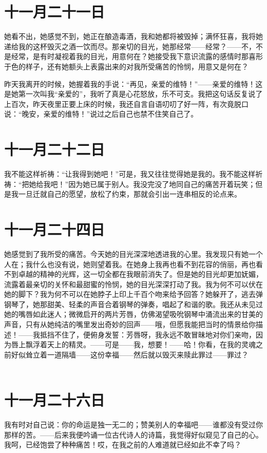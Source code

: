 \documentclass[12pt,oneside]{book}
\begin{document}
\chapter{十一月二十一日}
她看不出，她感觉不到，她正在酿造毒酒，我和她都将被毁掉；满怀狂喜，我将她递给我的这杯毁灭之酒一饮而尽。那亲切的目光，她那经常——经常？——不，不是经常，是有时凝视着我的目光，用意何在？她接受我下意识流露的感情时那喜形于色的样子，还有她额头上表露出来的对我所受痛苦的怜悯，用意又是何在？

昨天我离开的时候，她握着我的手说：“再见，亲爱的维特！”——亲爱的维特！这是她第一次叫我“亲爱的”，我听了真是心花怒放，乐不可支。我把这句话反复说了上百次，昨天夜里正要上床的时候，我还自言自语叨叨了好一阵，有次竟脱口说：“晚安，亲爱的维特！”说过之后自己也禁不住笑自己了。
　　

\chapter{十一月二十二日}
我不能这样祈祷：“让我得到她吧！”可是，我又往往觉得她是我的。我不能这样祈祷：“把她给我吧！”因为她已属于别人。我没完没了地同自己的痛苦开着玩笑；但是我一旦迁就自己的愿望，放松了约束，那就会引出一连串相反的论点来。
　　

\chapter{十一月二十四日}
她感觉到了我所受的痛苦。今天她的目光深深地透进我的心里。我发现只有她一个人在；我什么也没有说，她则望着我。在她身上我再也看不到花容的俏丽，再也看不到卓越的精神的光辉，这一切全都在我眼前消失了。但是她的目光却更加妩媚，流露着最亲切的关怀和最甜蜜的怜悯，她的目光深深打动了我。我为何不可以伏在她的脚下？我为何不可以在她脖子上印上千百个吻来给予回答？她躲开了，逃去弹钢琴了，她那甜美、轻柔的声音合着钢琴的弹奏，唱起了和谐的歌。我还从未见过她的嘴唇如此迷人；微微启开的两片芳唇，仿佛渴望吸吮钢琴中涌流出来的甘美的声音，只有从她纯洁的嘴里发出奇妙的回声——哦，但愿我能把当时的情景给你描述！——我抵挡不住了，便俯身发誓：芳唇呀，我永远不敢冒昧地对你们亲吻，因为唇上飘浮着天上的精灵。——可是——我，想要！——哈！你看，在我的灵魂之前好似耸立着一道隔墙——这份幸福——然后就以毁灭来赎此罪过——罪过？
　　

\chapter{十一月二十六日}
我有时对自己说：你的命运是独一无二的；赞美别人的幸福吧——谁都没有受过你那样的苦。——后来我便吟诵一位古代诗人的诗篇，我觉得好似窥见了自己的心。我呵，已经饱尝了种种痛苦！哎，在我之前的人难道就已经如此不幸了吗？
　　
\end{document}
